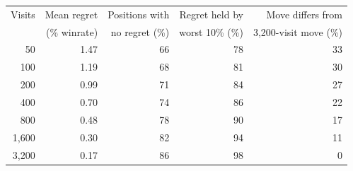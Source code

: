 \begin{tabular}{rrrrr}
\toprule
Visits & Mean regret & Positions with & Regret held by & Move differs from \\
 & (\% winrate) & no regret (\%) & worst 10\% (\%) & 3{,}200-visit move (\%) \\
\midrule
50 & 1.47 & 66 & 78 & 33 \\
100 & 1.19 & 68 & 81 & 30 \\
200 & 0.99 & 71 & 84 & 27 \\
400 & 0.70 & 74 & 86 & 22 \\
800 & 0.48 & 78 & 90 & 17 \\
1{,}600 & 0.30 & 82 & 94 & 11 \\
3{,}200 & 0.17 & 86 & 98 & 0 \\
\bottomrule
\end{tabular}
